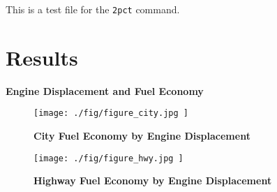\documentclass{article}
\begin{document}
This is a test file for the \texttt{2pct} command.

\section{Results}

\begin{table}[h]
    \caption{\textbf{ Engine Displacement and Fuel Economy  \label{ tab:reg }  }}
    \vspace{1em}
    \begin{centering}
    
    \par
    \medskip{}
    \end{centering}
\end{table}

\begin{figure}[!htb]
    \centering
    \texttt{[image:  ./fig/figure\_city.jpg ]}
    \caption{\textbf{ City Fuel Economy by Engine Displacement  \label{ fig:city } }}
    \medskip{}
    {\small{}  }{\small\par}
\end{figure}


\begin{figure}[!htb]
    \centering
    \texttt{[image:  ./fig/figure\_hwy.jpg ]}
    \caption{\textbf{ Highway Fuel Economy by Engine Displacement  \label{ fig:hwy } }}
    \medskip{}
    {\small{}  }{\small\par}
\end{figure}
\end{document}
